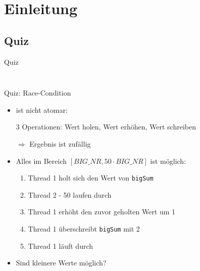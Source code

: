 \documentclass[usepdftitle=false,hyperref={pdfpagelabels=false}]{beamer}
\begin{document}
\title{\titleText}
\subtitle{Five-in-A-Row, Multithreading}
\author{\tutor}
\date{\today}
\subject{Programmieren}

\frame{\titlepage}



\section{Einleitung}
\subsection{Quiz}
\begin{frame}{Quiz}
    \begin{minipage}[b]{0.45\linewidth}
        \inputminted[linenos=true, numbersep=5pt, tabsize=4, fontsize=\tiny]{java}{QuizMain.java}
    \end{minipage}
    \hspace{0.5cm}
    \begin{minipage}[b]{0.45\linewidth}
        \inputminted[linenos=true, numbersep=5pt, tabsize=4, fontsize=\tiny]{java}{QuizSum.java}
        \vspace{3.5cm}
    \end{minipage}
\end{frame}

\begin{frame}{Quiz: Race-Condition}
    \begin{itemize}[<+->]
        \item {} ist nicht atomar:
        \item[] 3 Operationen: Wert holen, Wert erhöhen, Wert schreiben
        \item[$\Rightarrow$] Ergebnis ist zufällig
        \item Alles im Bereich $[BIG\_NR, 50 \cdot BIG\_NR]$ ist möglich:
            \begin{enumerate}
                \item Thread 1 holt sich den Wert von \texttt{bigSum}
                \item Thread 2 - 50 laufen durch
                \item Thread 1 erhöht den zuvor geholten Wert um 1
                \item Thread 1 überschreibt \texttt{bigSum} mit 2
                \item Thread 1 läuft durch
            \end{enumerate}
        \item Sind kleinere Werte möglich?
    \end{itemize}
\end{frame}
\end{document}
